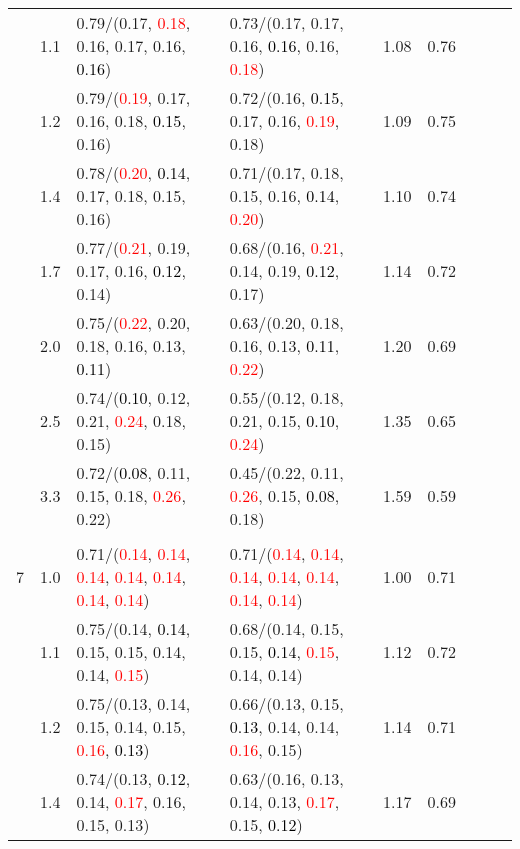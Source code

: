 \documentclass[10pt,a4paper]{report}
\begin{document}
\begin{table}[!htbp]
\begin{center}
{\begin{tabular}{ccllccccc}
			&1.1&0.79/(0.17, \textcolor{red}{0.18}, 0.16, 0.17, 0.16, \textcolor{black}{0.16})&0.73/(0.17, 0.17, 0.16, \textcolor{black}{0.16}, 0.16, \textcolor{red}{0.18})&1.08&0.76\\
			&1.2&0.79/(\textcolor{red}{0.19}, 0.17, 0.16, 0.18, \textcolor{black}{0.15}, 0.16)&0.72/(0.16, \textcolor{black}{0.15}, 0.17, 0.16, \textcolor{red}{0.19}, 0.18)&1.09&0.75\\
			&1.4&0.78/(\textcolor{red}{0.20}, \textcolor{black}{0.14}, 0.17, 0.18, 0.15, 0.16)&0.71/(0.17, 0.18, 0.15, 0.16, \textcolor{black}{0.14}, \textcolor{red}{0.20})&1.10&0.74\\
			&1.7&0.77/(\textcolor{red}{0.21}, 0.19, 0.17, 0.16, \textcolor{black}{0.12}, 0.14)&0.68/(0.16, \textcolor{red}{0.21}, 0.14, 0.19, \textcolor{black}{0.12}, 0.17)&1.14&0.72\\
			&2.0&0.75/(\textcolor{red}{0.22}, 0.20, 0.18, 0.16, 0.13, \textcolor{black}{0.11})&0.63/(0.20, 0.18, 0.16, 0.13, \textcolor{black}{0.11}, \textcolor{red}{0.22})&1.20&0.69\\
			&2.5&0.74/(\textcolor{black}{0.10}, 0.12, 0.21, \textcolor{red}{0.24}, 0.18, 0.15)&0.55/(0.12, 0.18, 0.21, 0.15, \textcolor{black}{0.10}, \textcolor{red}{0.24})&1.35&0.65\\
			&3.3&0.72/(\textcolor{black}{0.08}, 0.11, 0.15, 0.18, \textcolor{red}{0.26}, 0.22)&0.45/(0.22, 0.11, \textcolor{red}{0.26}, 0.15, \textcolor{black}{0.08}, 0.18)&1.59&0.59\\
			&&&&\\
			7			&1.0&0.71/(\textcolor{red}{0.14}, \textcolor{red}{0.14}, \textcolor{red}{0.14}, \textcolor{red}{0.14}, \textcolor{red}{0.14}, \textcolor{red}{0.14}, \textcolor{red}{0.14})&0.71/(\textcolor{red}{0.14}, \textcolor{red}{0.14}, \textcolor{red}{0.14}, \textcolor{red}{0.14}, \textcolor{red}{0.14}, \textcolor{red}{0.14}, \textcolor{red}{0.14})&1.00&0.71\\
			&1.1&0.75/(0.14, \textcolor{black}{0.14}, 0.15, 0.15, 0.14, 0.14, \textcolor{red}{0.15})&0.68/(0.14, 0.15, 0.15, \textcolor{black}{0.14}, \textcolor{red}{0.15}, 0.14, 0.14)&1.12&0.72\\
			&1.2&0.75/(0.13, 0.14, 0.15, 0.14, 0.15, \textcolor{red}{0.16}, \textcolor{black}{0.13})&0.66/(0.13, 0.15, \textcolor{black}{0.13}, 0.14, 0.14, \textcolor{red}{0.16}, 0.15)&1.14&0.71\\
			&1.4&0.74/(0.13, \textcolor{black}{0.12}, 0.14, \textcolor{red}{0.17}, 0.16, 0.15, 0.13)&0.63/(0.16, 0.13, 0.14, 0.13, \textcolor{red}{0.17}, 0.15, \textcolor{black}{0.12})&1.17&0.69\\

\end{tabular}}
\end{center}
\end{table}
\end{document}
